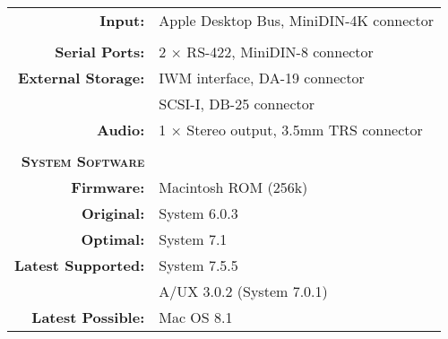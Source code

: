 \begin{tabular}{ r p{6in} }
\\
\textbf{Input:} & Apple Desktop Bus, MiniDIN-4K connector \\
\\
\textbf{Serial Ports:} & 2 \(\times\) RS-422, MiniDIN-8 connector \\
\textbf{External Storage:} & IWM interface, DA-19 connector \\
~ & SCSI-I, DB-25 connector \\
\textbf{Audio:} & 1 \(\times\) Stereo output, 3.5mm TRS connector \\
\\
\textbf{\textsc{System Software}} & ~ \\
\textbf{Firmware:} & Macintosh ROM (256k) \\
\textbf{Original:} & System 6.0.3 \\
\textbf{Optimal:} & System 7.1 \\
\textbf{Latest Supported:} & System 7.5.5 \\
~ & A/UX 3.0.2 (System 7.0.1) \\
\textbf{Latest Possible:} & Mac OS 8.1 \\
\end{tabular}
